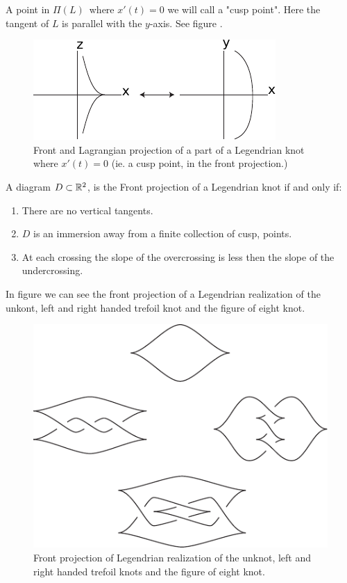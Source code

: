 A point in $\Pi(L)$ where $x'(t) = 0$ we will call a "cusp point". Here the
tangent of $L$ is parallel with the $y$-axis. See figure .

\begin{figure}
\centering
\includegraphics[width=.4\textwidth]{figs/cusp_point.pdf}
\caption{Front and Lagrangian projection of a part of a Legendrian knot where
$x'(t) = 0$ (ie. a cusp point, in the front projection.)}
\label{fig:cusp_point}
\end{figure}

\begin{lemma}
A diagram $D \subset \mathbb{R}^2$, is the Front projection of a Legendrian knot
if and only if:
\begin{enumerate}
\item
There are no vertical tangents.
\item 
$D$ is an immersion away from a finite collection of cusp, points.
\item 
At each crossing the slope of the overcrossing is less then the slope of the
undercrossing.
\end{enumerate}
\end{lemma}

\begin{exmp}
In figure  we can see the front projection of a Legendrian
realization of the unkont, left and right handed trefoil knot and the figure of
eight knot.
\end{exmp}

\begin{figure}[h]
\centering
\includegraphics[width=.4\textwidth]{figs/front_knots.pdf}
\caption{Front projection of Legendrian realization of the unknot, left and
right handed trefoil knots and the figure of eight knot.}
\label{fig:front_knots}
\end{figure}

